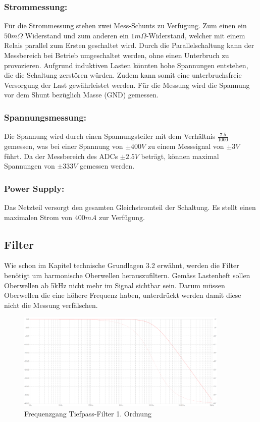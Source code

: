 \subsubsection*{Strommessung:}
Für die Strommessung stehen zwei Mess-Schunts zu Verfügung. Zum einen ein $50m\Omega$ Widerstand und zum anderen ein $1m\Omega$-Widerstand, welcher mit einem Relais parallel zum Ersten geschaltet wird. Durch die Parallelschaltung kann der Messbereich bei Betrieb umgeschaltet werden, ohne einen Unterbruch zu provozieren. Aufgrund induktiven Lasten könnten hohe Spannungen entstehen, die die Schaltung zerstören würden. Zudem kann somit eine unterbruchsfreie Versorgung der Last gewährleistet werden. Für die Messung wird die Spannung vor dem Shunt bezüglich Masse (GND) gemessen.

\subsubsection*{Spannungsmessung:}
Die Spannung wird durch einen Spannungsteiler mit dem Verhältnis $\frac{7.5}{1000}$ gemessen, was bei einer Spannung von $\pm 400V$ zu einem Messsignal von $\pm 3V$ führt. Da der Messbereich des ADCs $\pm 2.5V$ beträgt, können maximal Spannungen von $\pm 333V$ gemessen werden.

\subsubsection*{Power Supply:}
Das Netzteil versorgt den gesamten Gleichstromteil der Schaltung. Es stellt einen maximalen Strom von $400mA$ zur Verfügung.

\subsection{Filter}

Wie schon im Kapitel technische Grundlagen 3.2 erwähnt, werden die Filter benötigt um harmonische Oberwellen herauszufiltern. Gemäss Lastenheft sollen Oberwellen ab 5kHz nicht mehr im Signal sichtbar sein. Darum müssen Oberwellen die eine höhere Frequenz haben, unterdrückt werden damit diese nicht die Messung verfälschen.

\begin{figure}[H]
\begin{center}
\includegraphics[width=0.9\textwidth]{images/Analoge_Schaltung_Frequenzgang.png}
\caption{Frequenzgang Tiefpass-Filter 1. Ordnung}
\end{center}
\end{figure}


